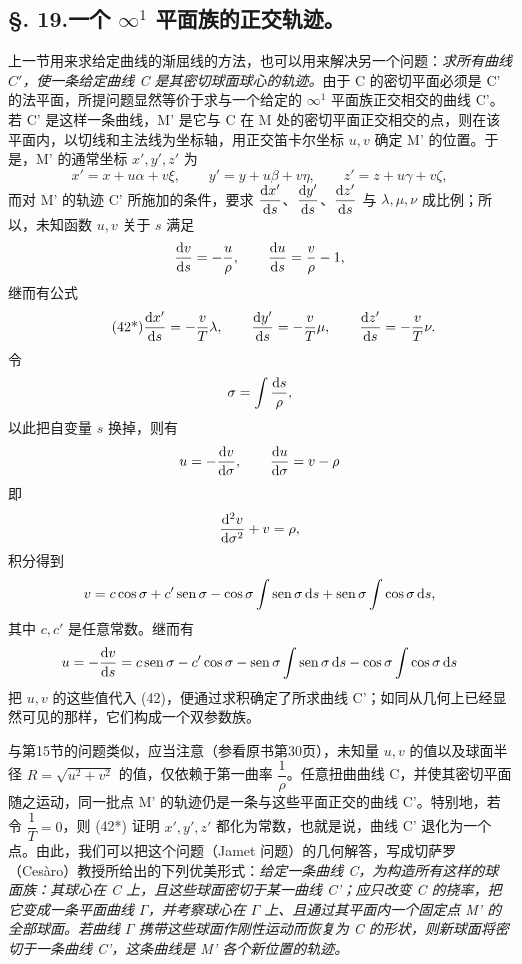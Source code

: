 \subsection*{\S. 19.\quad 一个 \(\infty^1\) 平面族的正交轨迹。}
上一节用来求给定曲线的渐屈线的方法，也可以用来解决另一个问题：\emph{求所有曲线 \(C'\)，使一条给定曲线 C 是其密切球面球心的轨迹。}由于 C 的密切平面必须是 C' 的法平面，所提问题显然等价于求与一个给定的 \(\infty^1\) 平面族正交相交的曲线 C'。若 C' 是这样一条曲线，M' 是它与 C 在 M 处的密切平面正交相交的点，则在该平面内，以切线和主法线为坐标轴，用正交笛卡尔坐标 \(u,v\) 确定 M' 的位置。于是，M' 的通常坐标 \(x',y',z'\) 为
\begin{equation}\tag{42}
x'=x+u\alpha+v\xi,\qquad y'=y+u\beta+v\eta,\qquad z'=z+u\gamma+v\zeta,
\end{equation}
而对 M' 的轨迹 C' 所施加的条件，要求 \(\dfrac{\mathrm{d} x'}{\mathrm{d} s}\)、\(\dfrac{\mathrm{d} y'}{\mathrm{d} s}\)、\(\dfrac{\mathrm{d} z'}{\mathrm{d} s}\) 与 \(\lambda,\mu,\nu\) 成比例；所以，未知函数 \(u,v\) 关于 \(s\) 满足
\[
\frac{\mathrm{d} v}{\mathrm{d} s}=-\frac{u}{\rho},\qquad
\frac{\mathrm{d} u}{\mathrm{d} s}=\frac{v}{\rho}-1,
\]
继而有公式
\begin{equation}\tag{42*}
\frac{\mathrm{d} x'}{\mathrm{d} s}=-\frac{v}{T}\lambda,\qquad
\frac{\mathrm{d} y'}{\mathrm{d} s}=-\frac{v}{T}\mu,\qquad
\frac{\mathrm{d} z'}{\mathrm{d} s}=-\frac{v}{T}\nu.
\end{equation}
令
\[
\sigma=\int\frac{\mathrm{d} s}{\rho},
\]
以此把自变量 \(s\) 换掉，则有
\[
u=-\frac{\mathrm{d} v}{\mathrm{d}\sigma},\qquad \frac{\mathrm{d} u}{\mathrm{d}\sigma}=v-\rho
\]
即
\[
\frac{\mathrm{d}^2 v}{\mathrm{d}\sigma^2}+v=\rho,
\]
积分得到
\[
v=c\cos\sigma+c'\operatorname{sen}\sigma-\cos\sigma\int\operatorname{sen}\sigma\,\mathrm{d} s+\operatorname{sen}\sigma\int\cos\sigma\,\mathrm{d} s,
\]
其中 \(c,c'\) 是任意常数。继而有
\[
u=-\frac{\mathrm{d} v}{\mathrm{d} s}=c\operatorname{sen}\sigma-c'\cos\sigma-\operatorname{sen}\sigma\int\operatorname{sen}\sigma\,\mathrm{d} s-\cos\sigma\int\cos\sigma\,\mathrm{d} s
\]
把 \(u,v\) 的这些值代入 (42)，便通过求积确定了所求曲线 C'；如同从几何上已经显然可见的那样，它们构成一个双参数族。

与第15节的问题类似，应当注意（参看原书第30页），未知量 \(u,v\) 的值以及球面半径 \(R=\sqrt{u^2+v^2}\) 的值，仅依赖于第一曲率 \(\dfrac{1}{\rho}\)。任意扭曲曲线 C，并使其密切平面随之运动，同一批点 M' 的轨迹仍是一条与这些平面正交的曲线 C'。特别地，若令 \(\dfrac{1}{T}=0\)，则 (42*) 证明 \(x',y',z'\) 都化为常数，也就是说，曲线 C' 退化为一个点。由此，我们可以把这个问题（Jamet 问题）的几何解答，写成切萨罗（Cesàro）教授所给出的下列优美形式：\emph{给定一条曲线 C，为构造所有这样的球面族：其球心在 C 上，且这些球面密切于某一曲线 C'；应只改变 C 的挠率，把它变成一条平面曲线 \(\Gamma\)，并考察球心在 \(\Gamma\) 上、且通过其平面内一个固定点 M' 的全部球面。若曲线 \(\Gamma\) 携带这些球面作刚性运动而恢复为 C 的形状，则新球面将密切于一条曲线 C'，这条曲线是 M' 各个新位置的轨迹。}
